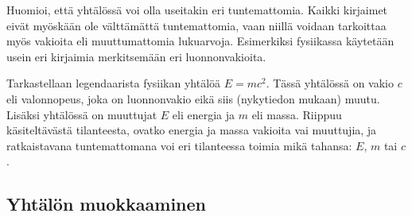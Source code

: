 Huomioi, että yhtälössä voi olla useitakin eri tuntemattomia. Kaikki kirjaimet eivät myöskään ole välttämättä tuntemattomia, vaan niillä voidaan tarkoittaa myös vakioita eli muuttumattomia lukuarvoja. Esimerkiksi fysiikassa käytetään usein eri kirjaimia merkitsemään eri luonnonvakioita.

\begin{esimerkki}
Tarkastellaan legendaarista fysiikan yhtälöä $E=mc^2$. Tässä yhtälössä on vakio $c$ eli valonnopeus, joka on luonnonvakio eikä siis (nykytiedon mukaan) muutu. Lisäksi yhtälössä on muuttujat $E$ eli energia ja $m$ eli massa. Riippuu käsiteltävästä tilanteesta, ovatko energia ja massa vakioita vai muuttujia, ja ratkaistavana tuntemattomana voi eri tilanteessa toimia mikä tahansa: $E$, $m$ tai $c$.
\end{esimerkki}

\newpage %
\subsection{Yhtälön muokkaaminen}


